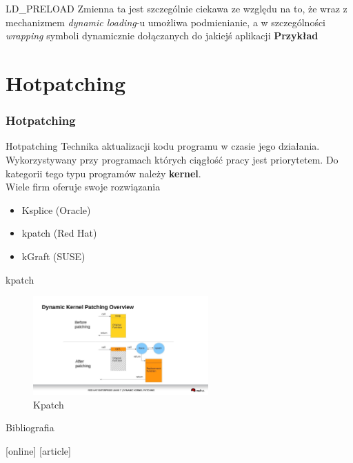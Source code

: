 \begin{frame}{LD\_PRELOAD}
  Zmienna ta jest szczególnie ciekawa ze względu na to, że wraz z mechanizmem
  \textit{dynamic loading}-u umożliwa podmienianie, a w szczególności
  \textit{wrapping} symboli dynamicznie dołączanych do jakiejś aplikacji
  \textbf{Przykład}
\end{frame}
\part{Hotpatching}
\section{Hotpatching}
\begin{frame}{Hotpatching}
	Technika aktualizacji kodu programu w czasie jego działania. Wykorzystywany przy
	programach których ciągłość pracy jest priorytetem. Do kategorii tego typu programów należy
	\textbf{kernel}.\\
  \vspace{\baselineskip}
	Wiele firm oferuje swoje rozwiązania
	\begin{itemize}
	\item Ksplice (Oracle)
	\item kpatch (Red Hat)
	\item kGraft (SUSE)
	\end{itemize}
\end{frame}
\begin{frame}{kpatch}
	\begin{figure}[H]
		\centering \includegraphics[width = 0.6\textwidth]{kpatch.jpg}
		\caption{Kpatch \cite{kpatch}}
	\end{figure}
\end{frame}
\begin{frame}[allowframebreaks]{Bibliografia}
  \begin{thebibliography}{9}
    [online]
    [article]
  \end{thebibliography}
\end{frame}


